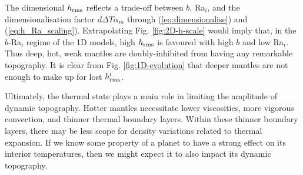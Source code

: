 The dimensional $h_{\rm rms}$ reflects a trade-off between $b$, Ra$_i$, and the dimensionalisation factor $d \Delta T \alpha_m$ through (\ref{eq:dimensionalise}) and (\ref{eq:h_Ra_scaling}). Extrapolating Fig. \ref{fig:2D-h-scale} would imply that, in the $b$-Ra$_i$ regime of the 1D models, high $h_{\rm rms}$ is favoured with high $b$ and low Ra$_i$. Thus deep, hot, weak mantles are doubly-inhibited from having any remarkable topography. It is clear from Fig. \ref{fig:1D-evolution} that deeper mantles are not enough to make up for lost $h_{\rm rms}^\prime$. 

Ultimately, the thermal state plays a main role in limiting the amplitude of dynamic topography. Hotter mantles necessitate lower viscosities, more vigorous convection, and thinner thermal boundary layers. Within these thinner boundary layers, there may be less scope for density variations related to thermal expansion. If we know some property of a planet to have a strong effect on its interior temperatures, then we might expect it to also impact its dynamic topography.











